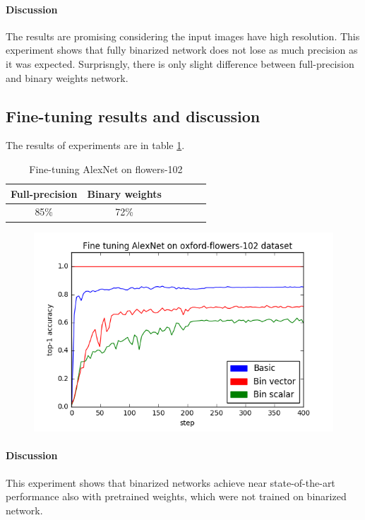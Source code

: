 \documentclass[licencjacka]{pracamgr}
\begin{document}
		        \paragraph{Discussion} 
                        The results are promising considering the input images have high resolution. This experiment shows that fully binarized network does not lose as much precision as it was expected. Surprisngly, there is only slight difference between full-precision and binary weights network.
		\subsection{Fine-tuning results and discussion}
		     
		        The results of experiments are in table \ref{table:1}.
		        \begin{table}[H]
                    \caption{Fine-tuning AlexNet on flowers-102}
                    \centering
                    \begin{tabular}{c c c c c c}
                    \hline\hline
			    Full-precision & Binary weights \\ [0.5ex]
                    \hline
			    85\% & 72\% \\
                    \hline
                    \end{tabular}
                    \label{table:1}
	            \end{table}
	            \begin{figure}[h]
				\centering
				\includegraphics[width=\textwidth]{images/AlexNet-flowers-102}
			\end{figure}
		        \paragraph{Discussion} 
			This experiment shows that binarized networks achieve near state-of-the-art performance also with pretrained weights, which were not trained on binarized network.
\end{document}
